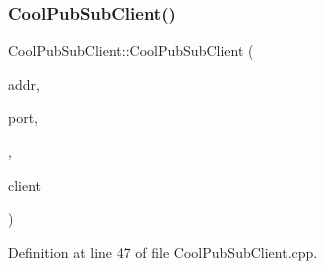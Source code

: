 \subsubsection{\texorpdfstring{Cool\+Pub\+Sub\+Client()}{CoolPubSubClient()}\hspace{0.1cm}{\footnotesize\ttfamily [5/14]}}
{\footnotesize\ttfamily Cool\+Pub\+Sub\+Client\+::\+Cool\+Pub\+Sub\+Client (\begin{DoxyParamCaption}\item[{I\+P\+Address}]{addr,  }\item[{uint16\+\_\+t}]{port,  }\item[{\hyperlink{class_cool_pub_sub_client_a021ec75e9fbaf658370b8005ccfddc14}{M\+Q\+T\+T\+\_\+\+C\+A\+L\+L\+B\+A\+C\+K\+\_\+\+S\+I\+G\+N\+A\+T\+U\+RE}}]{,  }\item[{Client \&}]{client }\end{DoxyParamCaption})}



Definition at line 47 of file Cool\+Pub\+Sub\+Client.\+cpp.


